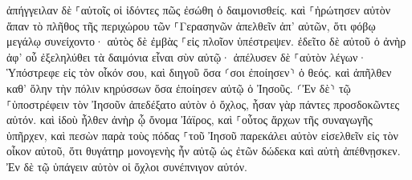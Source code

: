 \documentclass{openreader}
\begin{document}
ἀπήγγειλαν δὲ ⸀αὐτοῖς οἱ ἰδόντες πῶς ἐσώθη ὁ δαιμονισθείς. 
καὶ ⸀ἠρώτησεν αὐτὸν ἅπαν τὸ πλῆθος τῆς περιχώρου τῶν ⸀Γερασηνῶν ἀπελθεῖν ἀπ’ αὐτῶν, ὅτι φόβῳ μεγάλῳ συνείχοντο· αὐτὸς δὲ ἐμβὰς ⸀εἰς πλοῖον ὑπέστρεψεν. 
ἐδεῖτο δὲ αὐτοῦ ὁ ἀνὴρ ἀφ’ οὗ ἐξεληλύθει τὰ δαιμόνια εἶναι σὺν αὐτῷ· ἀπέλυσεν δὲ ⸀αὐτὸν λέγων· 
Ὑπόστρεφε εἰς τὸν οἶκόν σου, καὶ διηγοῦ ὅσα ⸂σοι ἐποίησεν⸃ ὁ θεός. καὶ ἀπῆλθεν καθ’ ὅλην τὴν πόλιν κηρύσσων ὅσα ἐποίησεν αὐτῷ ὁ Ἰησοῦς. 
⸂Ἐν δὲ⸃ τῷ ⸀ὑποστρέφειν τὸν Ἰησοῦν ἀπεδέξατο αὐτὸν ὁ ὄχλος, ἦσαν γὰρ πάντες προσδοκῶντες αὐτόν. 
καὶ ἰδοὺ ἦλθεν ἀνὴρ ᾧ ὄνομα Ἰάϊρος, καὶ ⸀οὗτος ἄρχων τῆς συναγωγῆς ὑπῆρχεν, καὶ πεσὼν παρὰ τοὺς πόδας ⸀τοῦ Ἰησοῦ παρεκάλει αὐτὸν εἰσελθεῖν εἰς τὸν οἶκον αὐτοῦ, 
ὅτι θυγάτηρ μονογενὴς ἦν αὐτῷ ὡς ἐτῶν δώδεκα καὶ αὐτὴ ἀπέθνῃσκεν. Ἐν δὲ τῷ ὑπάγειν αὐτὸν οἱ ὄχλοι συνέπνιγον αὐτόν. 
\end{document}
